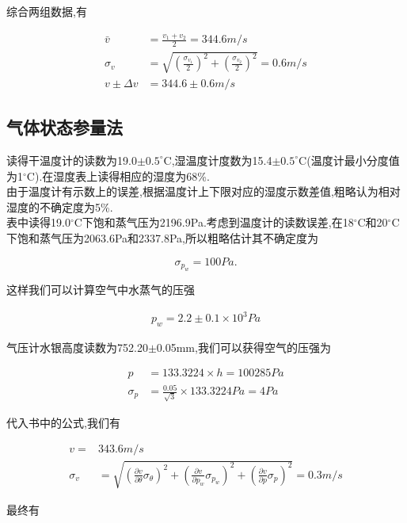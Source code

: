 \documentclass[a4paper,10pt,notitlepage]{article}
\begin{document}
	综合两组数据,有
	
\begin{align}
	\bar{v} &= \frac{v_1 + v_2}{2} = 344.6m/s \\
	\sigma_v &= \sqrt{(\frac{\sigma_{v_1}}{2})^2 + (\frac{\sigma_{v_2}}{2})^2} = 0.6 m/s \\
	v \pm \Delta v &= 344.6 \pm 0.6 m/s
\end{align}

\subsection{气体状态参量法}

	读得干温度计的读数为19.0$\pm 0.5 ^\circ$C,湿温度计度数为15.4$\pm 0.5 ^\circ$C(温度计最小分度值为1$^\circ$C).在湿度表上读得相应的湿度为68\%. \\
	
	由于温度计有示数上的误差,根据温度计上下限对应的湿度示数差值,粗略认为相对湿度的不确定度为5\%. \\
	
	表中读得19.0$^\circ$C下饱和蒸气压为2196.9Pa.考虑到温度计的读数误差,在18$^\circ$C和20$^\circ$C下饱和蒸气压为2063.6Pa和2337.8Pa,所以粗略估计其不确定度为
	
\begin{equation}
	\sigma_{p_w} = 100Pa.
\end{equation}

	这样我们可以计算空气中水蒸气的压强
	
\begin{align}
	p_w = 2.2 \pm 0.1 \times 10^3 Pa 
\end{align}
	
	气压计水银高度读数为752.20$\pm$0.05mm,我们可以获得空气的压强为
	
\begin{align}
	p &= 133.3224 \times h = 100285 Pa \\
	\sigma_p &= \frac{0.05}{\sqrt{3}} \times 133.3224 Pa = 4Pa
\end{align}

	代入书中的公式,我们有
	
\begin{align}
	v =& 343.6 m/s \\
	\sigma_v&=\sqrt{(\frac{\partial v}{\partial \theta}\sigma_\theta)^2+(\frac{\partial v}{\partial p_w}\sigma_{p_w})^2+(\frac{\partial v}{\partial p}\sigma_p)^2}=0.3m/s
\end{align}
	
	最终有
	
\end{document}
